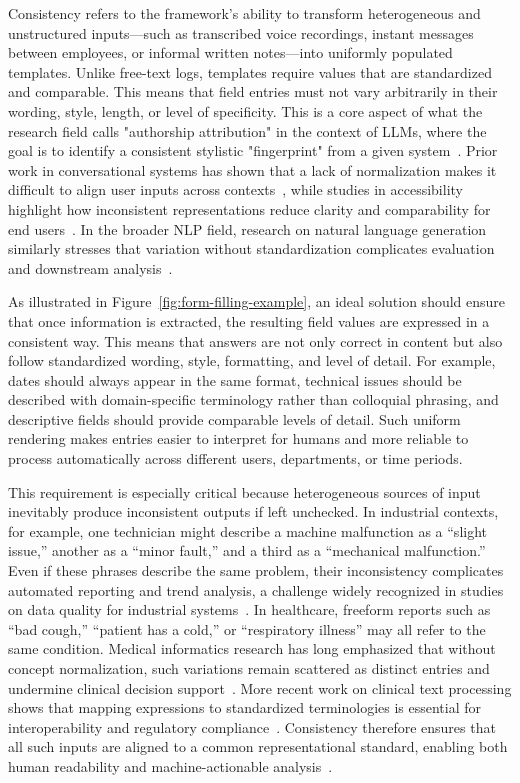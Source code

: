 Consistency refers to the framework’s ability to transform heterogeneous and unstructured inputs—such as transcribed voice recordings, instant messages between employees, or informal written notes—into uniformly populated templates. Unlike free-text logs, templates require values that are standardized and comparable. This means that field entries must not vary arbitrarily in their wording, style, length, or level of specificity. This is a core aspect of what the research field calls "authorship attribution" in the context of LLMs, where the goal is to identify a consistent stylistic "fingerprint" from a given system~\cite{huang2024authorship}. Prior work in conversational systems has shown that a lack of normalization makes it difficult to align user inputs across contexts~\cite{liu2022conversational}, while studies in accessibility highlight how inconsistent representations reduce clarity and comparability for end users~\cite{clark2020accessible}. In the broader NLP field, research on natural language generation similarly stresses that variation without standardization complicates evaluation and downstream analysis~\cite{gatt2018survey}.


As illustrated in Figure~\ref{fig:form-filling-example}, an ideal solution should ensure that once information is extracted, the resulting field values are expressed in a consistent way. This means that answers are not only correct in content but also follow standardized wording, style, formatting, and level of detail. For example, dates should always appear in the same format, technical issues should be described with domain-specific terminology rather than colloquial phrasing, and descriptive fields should provide comparable levels of detail. Such uniform rendering makes entries easier to interpret for humans and more reliable to process automatically across different users, departments, or time periods.


This requirement is especially critical because heterogeneous sources of input inevitably produce inconsistent outputs if left unchecked. In industrial contexts, for example, one technician might describe a machine malfunction as a “slight issue,” another as a “minor fault,” and a third as a “mechanical malfunction.” Even if these phrases describe the same problem, their inconsistency complicates automated reporting and trend analysis, a challenge widely recognized in studies on data quality for industrial systems~\cite{norman2013design}. In healthcare, freeform reports such as “bad cough,” “patient has a cold,” or “respiratory illness” may all refer to the same condition. Medical informatics research has long emphasized that without concept normalization, such variations remain scattered as distinct entries and undermine clinical decision support~\cite{friedman2004survey}. More recent work on clinical text processing shows that mapping expressions to standardized terminologies is essential for interoperability and regulatory compliance~\cite{jonnalagadda2010medical, bodenreider2004unified}. Consistency therefore ensures that all such inputs are aligned to a common representational standard, enabling both human readability and machine-actionable analysis~\cite{shneiderman2016designing}.


